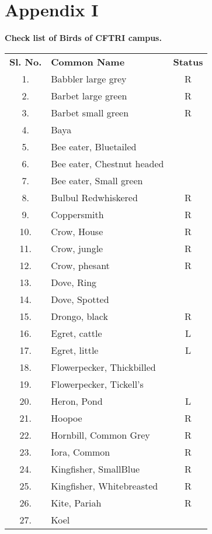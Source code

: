 
\chapter*{Appendix I}

\begin{center}
\smallskip
\textbf{Check list of Birds of CFTRI campus.}
\end{center}
\begin{longtable}{cp{5cm}c}
\textbf{Sl. No.} &  \textbf{Common Name}  & \textbf{Status}\\
1. & Babbler large grey & R \\
2. & Barbet large green & R \\
3. & Barbet small green & R \\
4. & Baya & \\
5. & Bee eater, Bluetailed & \\
6. & Bee eater, Chestnut headed & \\
7. & Bee eater, Small green & \\
8. & Bulbul Redwhiskered & R \\
9. & Coppersmith & R \\
10.& Crow, House & R  \\
11.& Crow, jungle & R \\
12.& Crow, phesant & R \\
13.& Dove, Ring & \\
14.& Dove, Spotted &\\  
15.& Drongo, black & R\\ 
16.& Egret, cattle & L \\
17.& Egret, little & L \\
18.& Flowerpecker, Thickbilled & \\
19.& Flowerpecker, Tickell's & \\
20.& Heron, Pond & L \\
21.& Hoopoe &  R \\
22.& Hornbill, Common Grey & R \\
23.& Iora, Common & R \\
24.& Kingfisher, SmallBlue & R \\
25.& Kingfisher, Whitebreasted & R\\  
26.& Kite, Pariah &R \\
27.& Koel &\\ 

\end{longtable}
